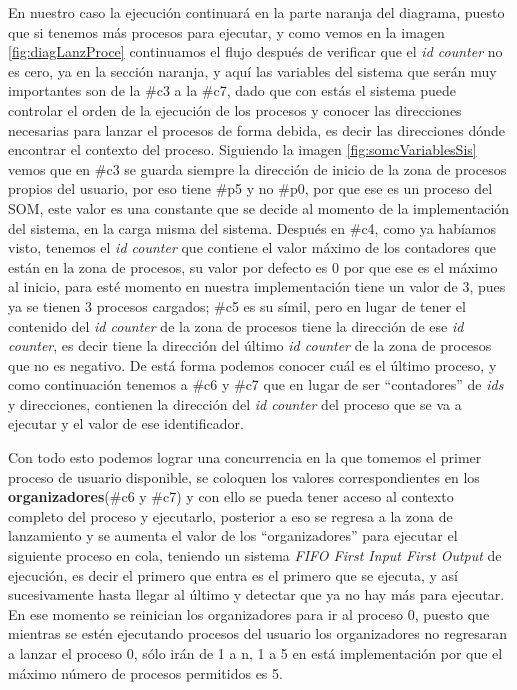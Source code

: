 \documentclass[letterpaper,12pt,oneside]{book}
\begin{document}
		En nuestro caso la ejecución continuará en la parte naranja del diagrama, puesto que si tenemos más procesos para ejecutar, y como vemos en
		la imagen \ref{fig:diagLanzProce} continuamos el flujo después de verificar que el \textit{id counter} no es cero, ya en la sección naranja, y aquí
		las variables del sistema que serán muy importantes son de la \#c3 a la \#c7, dado que con estás el sistema puede controlar el orden de la ejecución
		de los procesos y conocer las direcciones necesarias para lanzar el procesos de forma debida, es decir las direcciones dónde encontrar
		el contexto del proceso. Siguiendo la imagen \ref{fig:somcVariablesSis} vemos que en \#c3 se guarda siempre la dirección de inicio de la
		zona de procesos propios del usuario, por eso tiene \#p5 y no \#p0, por que ese es un proceso del SOM, este valor es una constante que se decide
		al momento de la implementación del sistema, en la carga misma del sistema. Después en \#c4, como ya habíamos visto, tenemos el \textit{id counter} que
		contiene el valor máximo de los contadores que están en la zona de procesos, su valor por defecto es 0 por que ese es el máximo al inicio, para esté momento
		en nuestra implementación tiene un valor de 3, pues ya se tienen 3 procesos cargados; \#c5 es su símil, pero en lugar de tener el contenido del \textit{id counter}
		de la zona de procesos tiene la dirección de ese \textit{id counter}, es decir tiene la dirección del último \textit{id counter} de la zona de procesos
		que no es negativo. De está forma podemos conocer cuál es el último proceso, y como continuación tenemos a \#c6 y \#c7 que en lugar de ser ``contadores''
		de \textit{ids} y direcciones, contienen la dirección del \textit{id counter} del proceso que se va a ejecutar y el valor de ese identificador.
		
		
		Con todo esto podemos lograr una concurrencia en la que tomemos el primer proceso de usuario disponible, se coloquen los valores correspondientes en los
		\textbf{organizadores}(\#c6 y \#c7) y con ello se pueda tener acceso al contexto completo del proceso y ejecutarlo, posterior a eso se regresa a la zona de lanzamiento
		y se aumenta el valor de los ``organizadores'' para ejecutar el siguiente proceso en cola, teniendo un sistema \textit{FIFO First Input First Output} de ejecución, 
		es decir el primero que entra es el primero que se ejecuta, y así sucesivamente hasta llegar al último y detectar que ya no hay más para ejecutar.
		En ese momento se reinician los organizadores para ir al proceso 0, puesto que mientras se estén ejecutando procesos del usuario los organizadores
		no regresaran a lanzar el proceso 0, sólo irán de 1 a n, 1 a 5 en está implementación por que el máximo número de procesos permitidos es 5.
		
\end{document}
